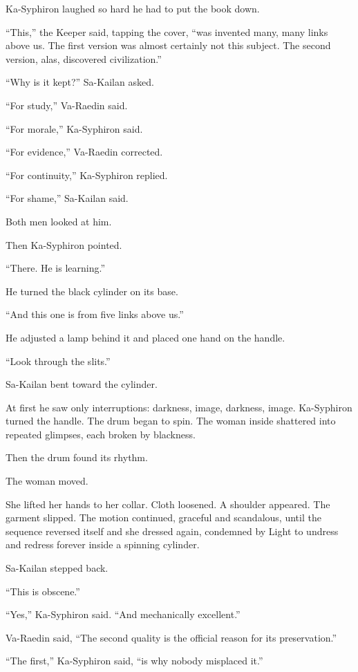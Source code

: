Ka-Syphiron laughed so hard he had to put the book down.\par
“This,” the Keeper said, tapping the cover, “was invented many, many links above us. The first version was almost certainly not this subject. The second version, alas, discovered civilization.”\par
“Why is it kept?” Sa-Kailan asked.\par
“For study,” Va-Raedin said.\par
“For morale,” Ka-Syphiron said.\par
“For evidence,” Va-Raedin corrected.\par
“For continuity,” Ka-Syphiron replied.\par
“For shame,” Sa-Kailan said.\par
Both men looked at him.\par
Then Ka-Syphiron pointed.\par
“There. He is learning.”\par
He turned the black cylinder on its base.\par
“And this one is from five links above us.”\par
He adjusted a lamp behind it and placed one hand on the handle.\par
“Look through the slits.”\par
Sa-Kailan bent toward the cylinder.\par
At first he saw only interruptions: darkness, image, darkness, image. Ka-Syphiron turned the handle. The drum began to spin. The woman inside shattered into repeated glimpses, each broken by blackness.\par
Then the drum found its rhythm.\par
The woman moved.\par
She lifted her hands to her collar. Cloth loosened. A shoulder appeared. The garment slipped. The motion continued, graceful and scandalous, until the sequence reversed itself and she dressed again, condemned by Light to undress and redress forever inside a spinning cylinder.\par
Sa-Kailan stepped back.\par
“This is obscene.”\par
“Yes,” Ka-Syphiron said. “And mechanically excellent.”\par
Va-Raedin said, “The second quality is the official reason for its preservation.”\par
“The first,” Ka-Syphiron said, “is why nobody misplaced it.”\par

